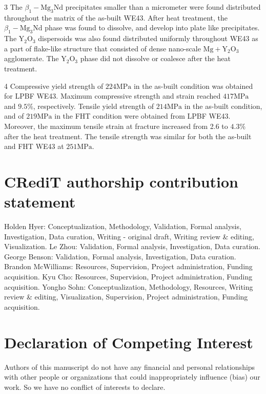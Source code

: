 \documentclass[10pt]{article}
\begin{document}
3 The $\beta_{1}-\mathrm{Mg}_{3} \mathrm{Nd}$ precipitates smaller than a micrometer were found distributed throughout the matrix of the as-built WE43. After heat treatment, the $\beta_{1}-\mathrm{Mg}_{3} \mathrm{Nd}$ phase was found to dissolve, and develop into plate like precipitates. The $\mathrm{Y}_{2} \mathrm{O}_{3}$ dispersoids was also found distributed uniformly throughout WE43 as a part of flake-like structure that consisted of dense nano-scale $\mathrm{Mg}+\mathrm{Y}_{2} \mathrm{O}_{3}$ agglomerate. The $\mathrm{Y}_{2} \mathrm{O}_{3}$ phase did not dissolve or coalesce after the heat treatment.

4 Compressive yield strength of $224 \mathrm{MPa}$ in the as-built condition was obtained for LPBF WE43. Maximum compressive strength and strain reached $417 \mathrm{MPa}$ and $9.5 \%$, respectively. Tensile yield strength of $214 \mathrm{MPa}$ in the as-built condition, and of $219 \mathrm{MPa}$ in the FHT condition were obtained from LPBF WE43. Moreover, the maximum tensile strain at fracture increased from 2.6 to $4.3 \%$ after the heat treatment. The tensile strength was similar for both the as-built and FHT WE43 at $251 \mathrm{MPa}$.

\section*{CRediT authorship contribution statement}
Holden Hyer: Conceptualization, Methodology, Validation, Formal analysis, Investigation, Data curation, Writing - original draft, Writing review \& editing, Visualization. Le Zhou: Validation, Formal analysis, Investigation, Data curation. George Benson: Validation, Formal analysis, Investigation, Data curation. Brandon McWilliams: Resources, Supervision, Project administration, Funding acquisition. Kyu Cho: Resources, Supervision, Project administration, Funding acquisition. Yongho Sohn: Conceptualization, Methodology, Resources, Writing review \& editing, Visualization, Supervision, Project administration, Funding acquisition.

\section*{Declaration of Competing Interest}
Authors of this manuscript do not have any financial and personal relationships with other people or organizations that could inappropriately influence (bias) our work. So we have no conflict of interests to declare.
\end{document}
